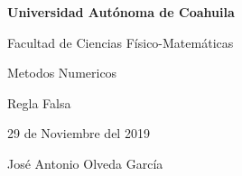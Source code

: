 \documentclass{article}
\begin{document}
\begin{center}
{\Large \textbf{Universidad Autónoma de Coahuila}}
\end{center}

\begin{center}
{\large Facultad de Ciencias Físico-Matemáticas}
\end{center}

\begin{center}
{\large Metodos Numericos}
\end{center}

\begin{center}
{\large Regla Falsa}
\end{center}

\begin{center}
{\large 29 de Noviembre del 2019}
\end{center}

\begin{center}
{\large José Antonio Olveda García}
\end{center}

\vspace{5mm}
\end{document}
